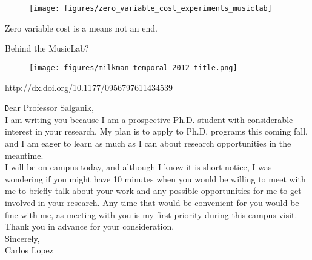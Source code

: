 \documentclass[aspectratio=169]{beamer}
\def\vf{\vfill}
\begin{document}
\begin{frame}

\begin{figure}
  \centering
  \texttt{[image: figures/zero\_variable\_cost\_experiments\_musiclab]}
\end{figure}

\vf
\pause
\Large{Zero variable cost is a means not an end.}

\end{frame}
\begin{frame}

{\Large
\begin{center}
Behind the MusicLab?
\end{center}
}

\end{frame}
\begin{frame}

\begin{figure}
  \centering
  \texttt{[image: figures/milkman\_temporal\_2012\_title.png]}
\end{figure}

\vf
\tiny{\url{http://dx.doi.org/10.1177/0956797611434539}}

\end{frame}
\begin{frame}

{\texttt
Dear Professor Salganik,\\ 

I am writing you because I am a prospective Ph.D. student with considerable interest in your research. My plan is to apply to Ph.D. programs this coming fall, and I am eager to learn as much as I can about research opportunities in the meantime.\\

I will be on campus today, and although I know it is short notice, I was wondering if you might have 10 minutes when you would be willing to meet with me to briefly talk about your work and any possible opportunities for me to get involved in your research. Any time that would be convenient for you would be fine with me, as meeting with you is my first priority during this campus visit.\\

Thank you in advance for your consideration.\\

Sincerely,\\
Carlos Lopez
}

\end{frame}
\end{document}
